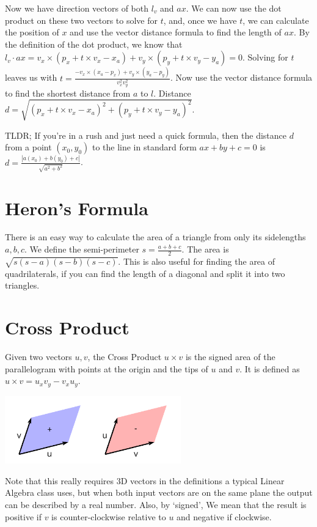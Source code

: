 \documentclass[10pt]{book}
\begin{document}
Now we have direction vectors of both $l_v$ and $ax$. We can now use the dot product on these two vectors to solve for $t$, and, once we have $t$, we can calculate the position of $x$ and use the vector distance formula to find the length of $ax$. By the definition of the dot product, we know that $l_v \cdot ax = v_x \times (p_x + t \times v_x - x_a) + v_y \times (p_y + t \times v_y - y_a) = 0$. Solving for $t$ leaves us with $t = \frac{-v_x \times (x_a - p_x) + v_y \times (y_a - p_y)}{v^{2}_x v^{2}_y}$. Now use the vector distance formula to find the shortest distance from $a$ to $l$. Distance $d = \sqrt{(p_x + t \times v_x - x_a)^2 + (p_y + t \times v_y - y_a)^2}$.

TLDR; If you're in a rush and just need a quick formula, then the distance $d$ from a point $(x_0, y_0)$ to the line in standard form $ax + by + c = 0$ is $d = \frac{|a(x_0) + b(y_0) + c|}{\sqrt{a^2 + b^2}}$.


\section{Heron's Formula}
	There is an easy way to calculate the area of a triangle from only its sidelengths $a,b,c$. We define the semi-perimeter $s = \frac{a+b+c}{2}$. The area is $\sqrt{s(s-a)(s-b)(s-c)}$. This is also useful for finding the area of quadrilaterals, if you can find the length of a diagonal and split it into two triangles.

\section{Cross Product}
Given two vectors $u, v$, the Cross Product $u \times v$ is the signed area of the parallelogram with points at the origin and the tips of $u$ and $v$. It is defined as $u \times v = u_xv_y - v_xu_y$.
\begin{center}
\includegraphics[width=3in]{images/Cross_product_parallelogram}
\end{center}

Note that this really requires 3D vectors in the definitions a typical Linear Algebra class uses, but when both input vectors are on the same plane the output can be described by a real number. Also, by `signed', We mean that the result is positive if $v$ is counter-clockwise relative to $u$ and negative if clockwise. 
\end{document}
